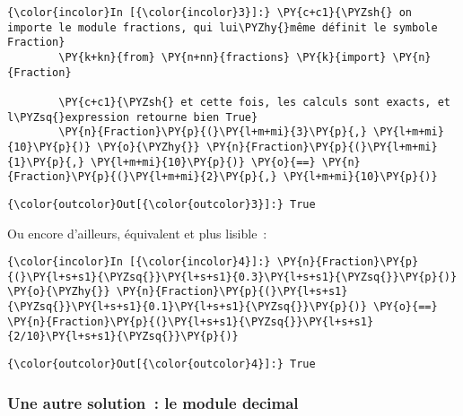     \begin{Verbatim}[commandchars=\\\{\},frame=single,framerule=0.3mm,rulecolor=\color{cellframecolor}]
{\color{incolor}In [{\color{incolor}3}]:} \PY{c+c1}{\PYZsh{} on importe le module fractions, qui lui\PYZhy{}même définit le symbole Fraction}
        \PY{k+kn}{from} \PY{n+nn}{fractions} \PY{k}{import} \PY{n}{Fraction}
        
        \PY{c+c1}{\PYZsh{} et cette fois, les calculs sont exacts, et l\PYZsq{}expression retourne bien True}
        \PY{n}{Fraction}\PY{p}{(}\PY{l+m+mi}{3}\PY{p}{,} \PY{l+m+mi}{10}\PY{p}{)} \PY{o}{\PYZhy{}} \PY{n}{Fraction}\PY{p}{(}\PY{l+m+mi}{1}\PY{p}{,} \PY{l+m+mi}{10}\PY{p}{)} \PY{o}{==} \PY{n}{Fraction}\PY{p}{(}\PY{l+m+mi}{2}\PY{p}{,} \PY{l+m+mi}{10}\PY{p}{)}
\end{Verbatim}


\begin{Verbatim}[commandchars=\\\{\},frame=single,framerule=0.3mm,rulecolor=\color{cellframecolor}]
{\color{outcolor}Out[{\color{outcolor}3}]:} True
\end{Verbatim}
            
    Ou encore d'ailleurs, équivalent et plus lisible~:

    \begin{Verbatim}[commandchars=\\\{\},frame=single,framerule=0.3mm,rulecolor=\color{cellframecolor}]
{\color{incolor}In [{\color{incolor}4}]:} \PY{n}{Fraction}\PY{p}{(}\PY{l+s+s1}{\PYZsq{}}\PY{l+s+s1}{0.3}\PY{l+s+s1}{\PYZsq{}}\PY{p}{)} \PY{o}{\PYZhy{}} \PY{n}{Fraction}\PY{p}{(}\PY{l+s+s1}{\PYZsq{}}\PY{l+s+s1}{0.1}\PY{l+s+s1}{\PYZsq{}}\PY{p}{)} \PY{o}{==} \PY{n}{Fraction}\PY{p}{(}\PY{l+s+s1}{\PYZsq{}}\PY{l+s+s1}{2/10}\PY{l+s+s1}{\PYZsq{}}\PY{p}{)}
\end{Verbatim}


\begin{Verbatim}[commandchars=\\\{\},frame=single,framerule=0.3mm,rulecolor=\color{cellframecolor}]
{\color{outcolor}Out[{\color{outcolor}4}]:} True
\end{Verbatim}
            
    \hypertarget{une-autre-solution-le-module-decimal}{%
\subsubsection{Une autre solution~: le module
decimal}\label{une-autre-solution-le-module-decimal}}

